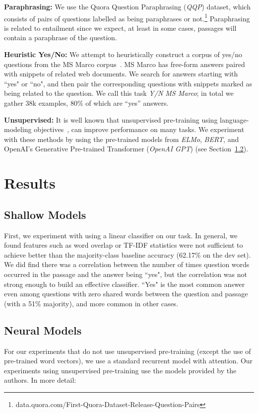 \textbf{Paraphrasing:} We use the Quora Question Paraphrasing (\textit{QQP}) dataset, which consists of pairs of questions labelled as being paraphrases or not.\footnote{data.quora.com/First-Quora-Dataset-Release-Question-Pairs} Paraphrasing is related to entailment since we expect, at least in some cases, passages will contain a paraphrase of the question.

\textbf{Heuristic Yes/No:} We attempt to heuristically construct a corpus of yes/no questions from the MS Marco corpus~\cite{msmarco}. MS Marco has free-form answers paired with snippets of related web documents. We search for answers starting with ``yes" or ``no", and then pair the corresponding questions with snippets marked as being related to the question. We call this task \textit{Y/N MS Marco}; in total we gather 38k examples, 80\% of which are ``yes'' answers.

\textbf{Unsupervised:} It is well known that unsupervised pre-training using language-modeling objectives~\cite{elmo, bert, openai}, can improve performance on many tasks. We experiment with these methods by using the pre-trained models from \textit{ELMo}, \textit{BERT}, and OpenAI's Generative Pre-trained Transformer (\textit{OpenAI GPT}) (see Section~\ref{sect:neural_models}).

\section{Results}

\subsection{Shallow Models} First, we experiment with using a linear classifier on our task. In general, we found features such as word overlap or TF-IDF statistics were not sufficient to achieve better than the majority-class baseline accuracy (62.17\% on the dev set). We did find there was a correlation between the number of times question words occurred in the passage and the answer being ``yes", but the correlation was not strong enough to build an effective classifier. ``Yes" is the most common answer even among questions with zero shared words between the question and passage (with a 51\% majority), and more common in other cases.

\subsection{Neural Models}
\label{sect:neural_models}
For our experiments that do not use unsupervised pre-training (except the use of pre-trained word vectors), we use a standard recurrent model with attention. Our experiments using unsupervised pre-training use the models provided by the authors. In more detail:


